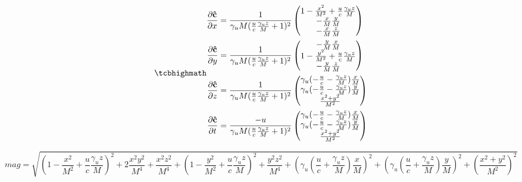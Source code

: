 \begin{equation}
	\mhl
	{
	\begin{aligned}
		\frac{\partial \mathbf{\hat{c}}}{\partial x} &=
	\frac{1}{\gamma_u M ( \frac{u}{c} \frac{\gamma_u z}{M} + 1 )^2}
	\begin{pmatrix}
		1 - \frac{x^2}{M^2} + \frac{u}{c}\frac{\gamma_u z}{M} \\
		- \frac{x}{M} \frac{y}{M} \\
		- \frac{x}{M} \frac{z}{M}
	\end{pmatrix} \\
	\frac{\partial \mathbf{\hat{c}}}{\partial y} &=
	\frac{1}{\gamma_u M ( \frac{u}{c} \frac{\gamma_u z}{M} + 1 )^2}
	\begin{pmatrix}
		- \frac{y}{M} \frac{x}{M} \\
		1 - \frac{y^2}{M^2} + \frac{u}{c}\frac{\gamma_u z}{M} \\
		- \frac{y}{M} \frac{z}{M}
	\end{pmatrix} \\
		\frac{\partial \mathbf{\hat{c}}}{\partial z} &= \frac{1}{\gamma_u M
		(  \frac{u}{c} \frac{\gamma_u z}{M} +  1 )^2}
		\begin{pmatrix}
			\gamma_u ( - \frac{u}{c}  - \frac{ \gamma_u z }{M} ) \frac{x}{M} \\
			\gamma_u ( - \frac{u}{c}  - \frac{\gamma_u z }{M} ) \frac{y}{M} \\
			\frac{ x^2 + y^2 }{M^2}
		\end{pmatrix}\\
		\frac{\partial \mathbf{\hat{c}}}{\partial t} &= \frac{-u}{\gamma_u M (  \frac{u}{c} \frac{\gamma_u z}{M} +  1 )^2}
	\begin{pmatrix}
		\gamma_u ( - \frac{u}{c}  - \frac{ \gamma_u z }{M} ) \frac{x}{M} \\
		\gamma_u ( - \frac{u}{c}  - \frac{\gamma_u z }{M} ) \frac{y}{M} \\
		 \frac{ x^2 + y^2 }{M^2}
	\end{pmatrix}
	\end{aligned}
	}
\end{equation}

\begin{equation}
	mag = \sqrt{ (1 - \frac{x^2}{M^2} + \frac{u}{c}\frac{\gamma_u z}{M})^2 + 2\frac{x^2y^2}{M^4} + \frac{x^2z^2}{M^4} +	(1 - \frac{y^2}{M^2} + \frac{u}{c}\frac{\gamma_u z}{M})^2 + \frac{y^2z^2}{M^4} +	(\gamma_u ( \frac{u}{c}  + \frac{ \gamma_u z }{M} ) \frac{x}{M})^2 + (\gamma_u ( \frac{u}{c}  + \frac{\gamma_u z }{M} ) \frac{y}{M})^2 + (\frac{ x^2 + y^2 }{M^2})^2 }
\end{equation}

